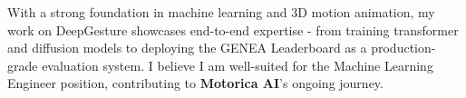 

\begin{onecolentry}
	With a strong foundation in machine learning and 3D motion animation, my work on DeepGesture showcases end-to-end expertise - from training transformer and diffusion models to deploying the GENEA Leaderboard as a production-grade evaluation system. I believe I am well-suited for the Machine Learning Engineer position, contributing to \textbf{Motorica AI}'s ongoing journey.
\end{onecolentry}
